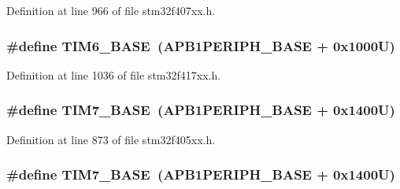 Definition at line 966 of file stm32f407xx.\+h.

\subsubsection[{\texorpdfstring{T\+I\+M6\+\_\+\+B\+A\+SE}{TIM6_BASE}}]{\setlength{\rightskip}{0pt plus 5cm}\#define T\+I\+M6\+\_\+\+B\+A\+SE~({\bf A\+P\+B1\+P\+E\+R\+I\+P\+H\+\_\+\+B\+A\+SE} + 0x1000\+U)}\hypertarget{group___peripheral__registers__structures_ga8268ec947929f192559f28c6bf7d1eac}{}\label{group___peripheral__registers__structures_ga8268ec947929f192559f28c6bf7d1eac}


Definition at line 1036 of file stm32f417xx.\+h.

\subsubsection[{\texorpdfstring{T\+I\+M7\+\_\+\+B\+A\+SE}{TIM7_BASE}}]{\setlength{\rightskip}{0pt plus 5cm}\#define T\+I\+M7\+\_\+\+B\+A\+SE~({\bf A\+P\+B1\+P\+E\+R\+I\+P\+H\+\_\+\+B\+A\+SE} + 0x1400\+U)}\hypertarget{group___peripheral__registers__structures_ga0ebf54364c6a2be6eb19ded6b18b6387}{}\label{group___peripheral__registers__structures_ga0ebf54364c6a2be6eb19ded6b18b6387}


Definition at line 873 of file stm32f405xx.\+h.

\subsubsection[{\texorpdfstring{T\+I\+M7\+\_\+\+B\+A\+SE}{TIM7_BASE}}]{\setlength{\rightskip}{0pt plus 5cm}\#define T\+I\+M7\+\_\+\+B\+A\+SE~({\bf A\+P\+B1\+P\+E\+R\+I\+P\+H\+\_\+\+B\+A\+SE} + 0x1400\+U)}\hypertarget{group___peripheral__registers__structures_ga0ebf54364c6a2be6eb19ded6b18b6387}{}\label{group___peripheral__registers__structures_ga0ebf54364c6a2be6eb19ded6b18b6387}


